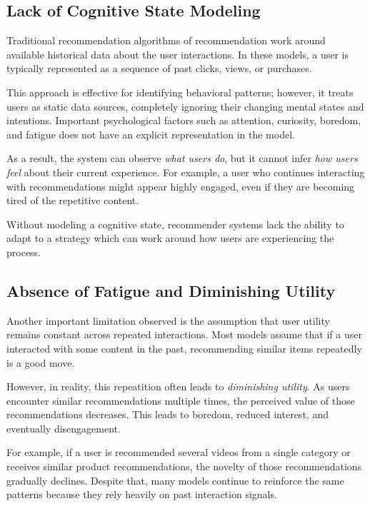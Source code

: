 \subsection{Lack of Cognitive State Modeling}

Traditional recommendation algorithms of recommendation work around 
available historical data about the user interactions.
In these models, a user is typically represented as 
a sequence of past clicks, views, or purchases.

This approach is effective for identifying behavioral patterns; however, it treats users 
as static data sources, completely ignoring their changing mental states and intentions.
Important psychological factors such as attention, curiosity, 
boredom, and fatigue does not have an explicit representation in the model.

As a result, the system can observe \textit{what users do}, but it 
cannot infer \textit{how users feel} about their current experience.
For example, a user who continues interacting with recommendations might appear 
highly engaged, even if they are becoming tired of the repetitive content.

Without modeling a cognitive state, recommender systems lack the ability to adapt 
to a strategy which can work around how users are experiencing the process.


\subsection{Absence of Fatigue and Diminishing Utility}

Another important limitation observed is the assumption that 
user utility remains constant across repeated interactions.
Most models assume that if a user interacted with some content in the past, 
recommending similar items repeatedly is a good move.

However, in reality, this repeatition often leads to \textit{diminishing utility}.
As users encounter similar recommendations multiple times, 
the perceived value of those recommendations decreases.
This leads to boredom, reduced interest, and eventually disengagement.

For example, if a user is recommended several videos from a single category or receives
similar product recommendations, the novelty of those recommendations gradually declines.
Despite that, many models continue to reinforce the same patterns 
because they rely heavily on past interaction signals.

